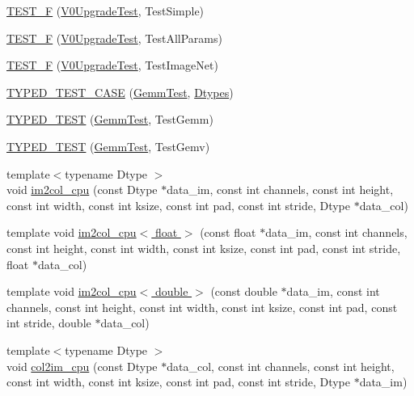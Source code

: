 \begin{DoxyCompactItemize}
\hyperlink{namespacecaffe_ac08efa3b7c91c17f5318f69f7b95f497}{T\+E\+S\+T\+\_\+\+F} (\hyperlink{classcaffe_1_1_v0_upgrade_test}{V0\+Upgrade\+Test}, Test\+Simple)
\item 
\hyperlink{namespacecaffe_a9288646606951694b9b4ecdc131e3d94}{T\+E\+S\+T\+\_\+\+F} (\hyperlink{classcaffe_1_1_v0_upgrade_test}{V0\+Upgrade\+Test}, Test\+All\+Params)
\item 
\hyperlink{namespacecaffe_a173a192c5184f5aeb6722658829dfd6a}{T\+E\+S\+T\+\_\+\+F} (\hyperlink{classcaffe_1_1_v0_upgrade_test}{V0\+Upgrade\+Test}, Test\+Image\+Net)
\item 
\hyperlink{namespacecaffe_aa853f7cd0d348a0a17c19d4edc48458d}{T\+Y\+P\+E\+D\+\_\+\+T\+E\+S\+T\+\_\+\+C\+A\+S\+E} (\hyperlink{classcaffe_1_1_gemm_test}{Gemm\+Test}, \hyperlink{namespacecaffe_a131dc2be50f2f10e18450da61cde6b57}{Dtypes})
\item 
\hyperlink{namespacecaffe_a921af67057a6f7687dcad3497232b975}{T\+Y\+P\+E\+D\+\_\+\+T\+E\+S\+T} (\hyperlink{classcaffe_1_1_gemm_test}{Gemm\+Test}, Test\+Gemm)
\item 
\hyperlink{namespacecaffe_a81a1d4aac55e8a583fd7f036c5a32194}{T\+Y\+P\+E\+D\+\_\+\+T\+E\+S\+T} (\hyperlink{classcaffe_1_1_gemm_test}{Gemm\+Test}, Test\+Gemv)
\item 
{\footnotesize template$<$typename Dtype $>$ }\\void \hyperlink{namespacecaffe_a1372d353fc4674a70e209164ebf13533}{im2col\+\_\+cpu} (const Dtype $\ast$data\+\_\+im, const int channels, const int height, const int width, const int ksize, const int pad, const int stride, Dtype $\ast$data\+\_\+col)
\item 
template void \hyperlink{namespacecaffe_a31d0b7b6d4c28cfd96a220f48d88df9f}{im2col\+\_\+cpu$<$ float $>$} (const float $\ast$data\+\_\+im, const int channels, const int height, const int width, const int ksize, const int pad, const int stride, float $\ast$data\+\_\+col)
\item 
template void \hyperlink{namespacecaffe_abc3bc513bb22741ac98db329d899349d}{im2col\+\_\+cpu$<$ double $>$} (const double $\ast$data\+\_\+im, const int channels, const int height, const int width, const int ksize, const int pad, const int stride, double $\ast$data\+\_\+col)
\item 
{\footnotesize template$<$typename Dtype $>$ }\\void \hyperlink{namespacecaffe_aeb0e6b4078faacd2bf4d11dfce427946}{col2im\+\_\+cpu} (const Dtype $\ast$data\+\_\+col, const int channels, const int height, const int width, const int ksize, const int pad, const int stride, Dtype $\ast$data\+\_\+im)

\end{DoxyCompactItemize}
